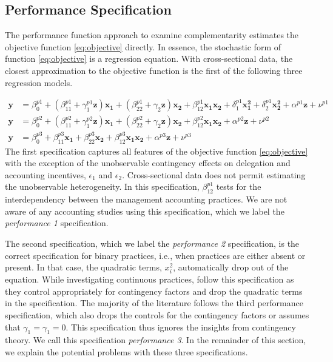 \documentclass[12pt]{article}
\begin{document}
\subsection{Performance Specification}

The performance function approach to examine complementarity estimates the objective function \eqref{eq:objective} directly. In essence, the stochastic form of function \eqref{eq:objective} is a regression equation. With cross-sectional data, the closest approximation to the objective function is the first of the following three regression models.  

\begin{align*}
\mathbf{y} &=  \beta^{p1}_0 + (\beta^{p1}_{11} + \gamma_1^{p1} \mathbf{z} )\mathbf{x_1} 
						+ (\beta_{22}^{p1} + \gamma_2 \mathbf{z} ) \mathbf{x_2} 
                        + \beta_{12}^{p1} \mathbf{x_1} \mathbf{x_2} 
                        + \delta_1^{p1} \mathbf{x^2_1} + \delta_2^{p1} \mathbf{x^2_2} 
                        + \alpha^{p1} \mathbf{z}
                        + \nu^{p1} \\
 \mathbf{y} &=  \beta^{p2}_0 + (\beta^{p2}_{11} + \gamma_1^{p2} \mathbf{z} )\mathbf{x_1} 
						+ (\beta_{22}^{p2} + \gamma_2 \mathbf{z} ) \mathbf{x_2} 
                        + \beta_{12}^{p2} \mathbf{x_1} \mathbf{x_2} 
                        + \alpha^{p2} \mathbf{z}
                        + \nu^{p2} \\
 \mathbf{y} &=  \beta^{p3}_0 + \beta^{p3}_{11} \mathbf{x_1} 
						+ \beta_{22}^{p3} \mathbf{x_2} 
                        + \beta_{12}^{p3} \mathbf{x_1} \mathbf{x_2} 
                        + \alpha^{p3} \mathbf{z}
                        + \nu^{p3}
\end{align*}
The first specification captures all features of the objective function \eqref{eq:objective} with the exception of the unobservable contingency effects on delegation and accounting incentives, $\epsilon_1$ and $\epsilon_2$. Cross-sectional data does not permit estimating the unobservable heterogeneity. In this specification, \(\beta_{12}^{p1}\) tests for the interdependency between the management accounting practices. We are not aware of any accounting studies using this specification, which we label the \emph{performance 1} specification. 

The second specification, which we label the \emph{performance 2} specification, is the correct specification for binary practices, i.e., when practices are either absent or present. In that case, the quadratic terms, $x_i^2$, automatically drop out of the equation. While investigating continuous practices, \citet{ bedford_management_2016, bedford_performance_2019} follow this specification as they control appropriately for contingency factors and drop the quadratic terms in the specification. The majority of the literature follows the third performance specification, which also drops the controls for the contingency factors or assumes that $\gamma_1 = \gamma_1 = 0$. This specification thus ignores the insights from contingency theory. We call this specification \emph{performance 3}. In the remainder of this section, we explain the potential problems with these three specifications.
\end{document}

